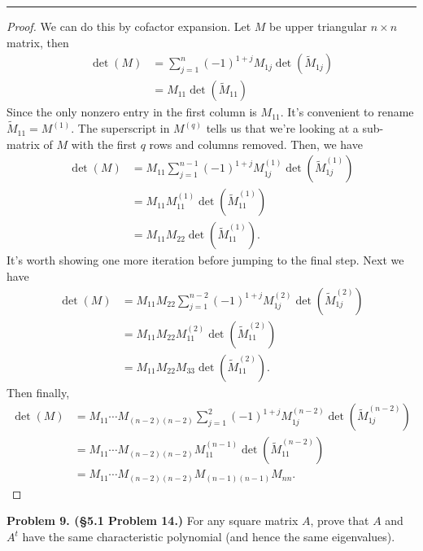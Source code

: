 \documentclass[leqno]{article}
\theoremstyle{nonumberplain}
\newtheorem{proof}{Proof}
\begin{document}
\noindent\rule[0.5ex]{\linewidth}{1pt}

\begin{proof}
We can do this by cofactor expansion.  Let $M$ be upper triangular $n\times n$ matrix, then
\begin{align*}
\det(M)&=\sum_{j=1}^n (-1)^{1+j} M_{1j}\det(\tilde{M}_{1j})\\
&=M_{11}\det(\tilde{M}_{11})
\end{align*}
Since the only nonzero entry in the first column is $M_{11}$. It's convenient to rename $\tilde{M}_{11}=M^{(1)}$. The superscript in $M^{(q)}$ tells us that we're looking at a sub-matrix of $M$ with the first $q$ rows and columns removed. Then, we have
\begin{align*}
\det(M)&=M_{11} \sum_{j=1}^{n-1} (-1)^{1+j} M_{1j}^{(1)}\det(\tilde{M}_{1j}^{(1)})\\
&= M_{11} M_{11}^{(1)} \det(\tilde{M}_{11}^{(1)})\\
&=M_{11} M_{22} \det(\tilde{M}_{11}^{(1)}).
\end{align*}
It's worth showing one more iteration before jumping to the final step.  Next we have
\begin{align*}
\det(M)&=M_{11} M_{22} \sum_{j=1}^{n-2} (-1)^{1+j} M_{1j}^{(2)}\det(\tilde{M}_{1j}^{(2)})\\
&= M_{11} M_{22} M_{11}^{(2)} \det(\tilde{M}_{11}^{(2)})\\
&=M_{11} M_{22} M_{33} \det(\tilde{M}_{11}^{(2)}).
\end{align*}
Then finally,
\begin{align*}
\det(M)&=M_{11} \cdots M_{(n-2)(n-2)} \sum_{j=1}^{2} (-1)^{1+j} M_{1j}^{(n-2)}\det(\tilde{M}_{1j}^{(n-2)})\\
&= M_{11} \cdots M_{(n-2)(n-2)} M_{11}^{(n-1)} \det(\tilde{M}_{11}^{(n-2)})\\
&=M_{11} \cdots M_{(n-2)(n-2)} M_{(n-1)(n-1)} M_{nn}.
\end{align*}
\end{proof}

\pagebreak




\noindent\textbf{Problem 9. (\S 5.1 Problem 14.)} For any square matrix $A$, prove that $A$ and $A^t$ have the same characteristic polynomial (and hence the same eigenvalues).
\end{document}
